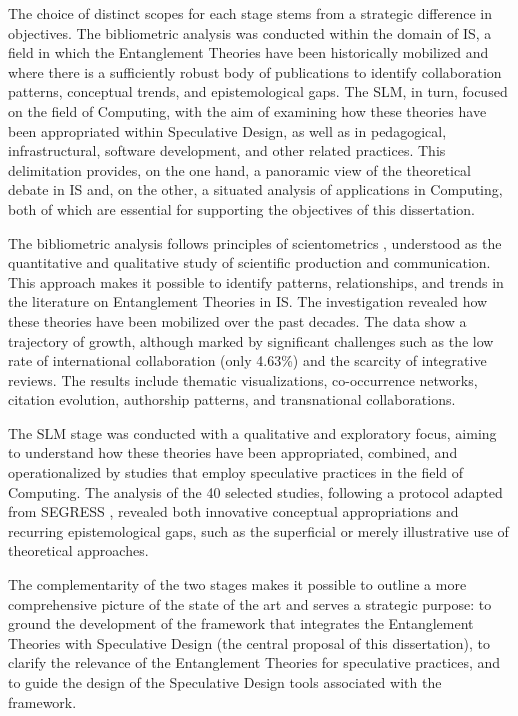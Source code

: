 The choice of distinct scopes for each stage stems from a strategic difference in objectives. The bibliometric analysis was conducted within the domain of IS, a field in which the Entanglement Theories have been historically mobilized and where there is a sufficiently robust body of publications to identify collaboration patterns, conceptual trends, and epistemological gaps. The SLM, in turn, focused on the field of Computing, with the aim of examining how these theories have been appropriated within Speculative Design, as well as in pedagogical, infrastructural, software development, and other related practices. This delimitation provides, on the one hand, a panoramic view of the theoretical debate in IS and, on the other, a situated analysis of applications in Computing, both of which are essential for supporting the objectives of this dissertation.

The bibliometric analysis follows principles of scientometrics \cite{hassan2010engaging}, understood as the quantitative and qualitative study of scientific production and communication. This approach makes it possible to identify patterns, relationships, and trends in the literature on Entanglement Theories in IS. The investigation revealed how these theories have been mobilized over the past decades. The data show a trajectory of growth, although marked by significant challenges such as the low rate of international collaboration (only 4.63\%) and the scarcity of integrative reviews. The results include thematic visualizations, co-occurrence networks, citation evolution, authorship patterns, and transnational collaborations.

The SLM stage was conducted with a qualitative and exploratory focus, aiming to understand how these theories have been appropriated, combined, and operationalized by studies that employ speculative practices in the field of Computing. The analysis of the 40 selected studies, following a protocol adapted from SEGRESS \cite{Kitchenham2022-SEGRESS}, revealed both innovative conceptual appropriations and recurring epistemological gaps, such as the superficial or merely illustrative use of theoretical approaches.

The complementarity of the two stages makes it possible to outline a more comprehensive picture of the state of the art and serves a strategic purpose: to ground the development of the framework that integrates the Entanglement Theories with Speculative Design (the central proposal of this dissertation), to clarify the relevance of the Entanglement Theories for speculative practices, and to guide the design of the Speculative Design tools associated with the framework.


